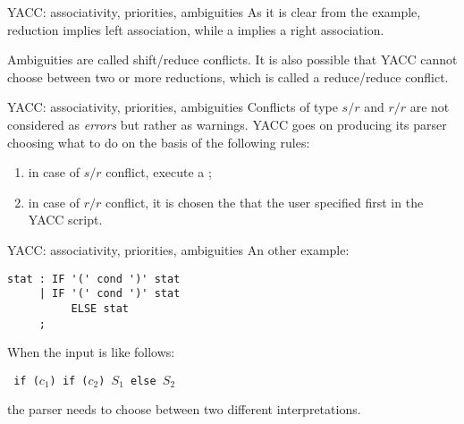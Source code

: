 \begin{frame}[fragile]{YACC: associativity, priorities, ambiguities}
As it is clear from the example, reduction implies  left association,
while a \shift{} implies a right association.


\vspace{20pt}

Ambiguities are called {\sc shift/reduce conflicts}.
It is also possible that YACC cannot choose between two or more
reductions, which is called
a {\sc reduce/reduce conflict}.


\end{frame}
\begin{frame}[fragile]{YACC: associativity, priorities, ambiguities}
Conflicts of type $s/r$ and $r/r$ are not considered as {\em errors\/} but
rather as warnings. YACC goes on producing its parser choosing
what to do on the basis of the following rules:


\vspace{20pt}

\label{disamb}
\begin{enumerate}
\item in case of $s/r$ conflict, execute a \shift;
\item in case of $r/r$ conflict, it is chosen the \reduce{}
      that the user specified first in the YACC script.
\end{enumerate}



\end{frame}
\begin{frame}[fragile]{YACC: associativity, priorities, ambiguities}
An other example:
\begin{verbatim}
stat : IF '(' cond ')' stat
     | IF '(' cond ')' stat
          ELSE stat
     ;
\end{verbatim}


\vspace{20pt}

When the input is like follows:


\vspace{20pt}

\begin{center}\tt
if ($c_1$) if ($c_2$) $S_1$ else $S_2$
\end{center}


\vspace{20pt}

the parser needs to choose between two different
interpretations.




\end{frame}
